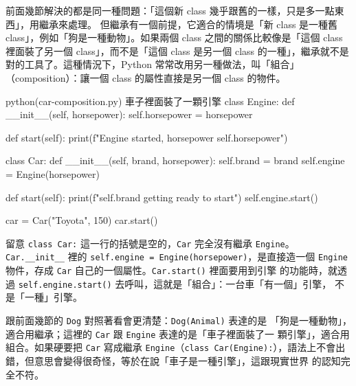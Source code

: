 前面幾節解決的都是同一種問題：「這個新 class 幾乎跟舊的一樣，只是多一點東西」，用繼承來處理。
但繼承有一個前提，它適合的情境是「新 class 是一種舊 class」，例如「狗是一種動物」。如果兩個
class 之間的關係比較像是「這個 class 裡面裝了另一個 class」，而不是「這個 class 是另一個
class 的一種」，繼承就不是對的工具了。這種情況下，Python 常常改用另一種做法，叫「組合」
（composition）：讓一個 class 的屬性直接是另一個 class 的物件。

\begin{example}{python}{(car-composition.py) 車子裡面裝了一顆引擎}
class Engine:
    def __init__(self, horsepower):
        self.horsepower = horsepower

    def start(self):
        print(f"Engine started, horsepower {self.horsepower}")


class Car:
    def __init__(self, brand, horsepower):
        self.brand = brand
        self.engine = Engine(horsepower)

    def start(self):
        print(f"{self.brand} getting ready to start")
        self.engine.start()


car = Car("Toyota", 150)
car.start()
\end{example}


留意 \texttt{class Car:} 這一行的括號是空的，\texttt{Car} 完全沒有繼承 \texttt{Engine}。
\texttt{Car.\_\_init\_\_} 裡的 \texttt{self.engine = Engine(horsepower)}，是直接造一個
\texttt{Engine} 物件，存成 \texttt{Car} 自己的一個屬性。\texttt{Car.start()} 裡面要用到引擎
的功能時，就透過 \texttt{self.engine.start()} 去呼叫，這就是「組合」：一台車「有一個」引擎，
不是「一種」引擎。

跟前面幾節的 \texttt{Dog} 對照著看會更清楚：\texttt{Dog(Animal)} 表達的是
「狗是一種動物」，適合用繼承；這裡的 \texttt{Car} 跟 \texttt{Engine} 表達的是「車子裡面裝了一
顆引擎」，適合用組合。如果硬要把 \texttt{Car} 寫成繼承 \texttt{Engine}（\texttt{class
Car(Engine):}），語法上不會出錯，但意思會變得很奇怪，等於在說「車子是一種引擎」，這跟現實世界
的認知完全不符。


